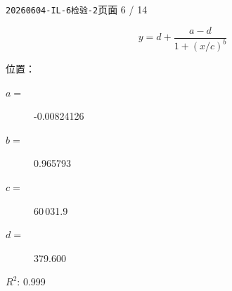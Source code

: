 \documentclass[UTF8,10pt,a4paper,fontset=fandol]{ctexart}
\newcommand{\fieldvalue}[1]{#1}
\begin{document}
\texttt{20260604-IL-6检验-2}\hfill 页面 6 / 14

\[
y=d+\frac{a-d}{1+(x/c)^b}
\]

位置：

\begin{description}
\item[$a=$]%
\fieldvalue{-0.00824126}

\item[$b=$]%
\fieldvalue{0.965793}

\item[$c=$]%
\fieldvalue{60\,031.9}

\item[$d=$]%
\fieldvalue{379.600}
\end{description}

$R^2$: %
\fieldvalue{0.999}
\end{document}
